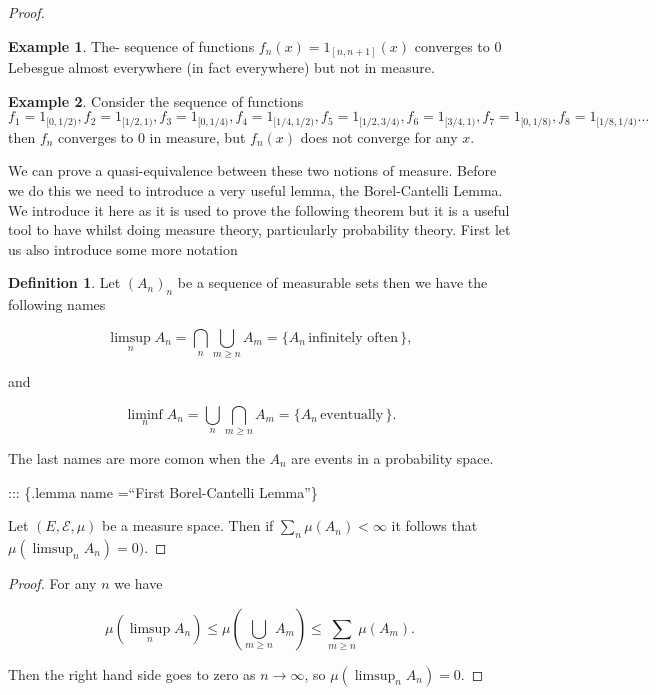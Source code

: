 \documentclass[
]{book}
\theoremstyle{definition}
\newtheorem{definition}{Definition}[chapter]
\theoremstyle{definition}
\newtheorem{example}{Example}[chapter]
\theoremstyle{definition}
\theoremstyle{definition}
\theoremstyle{remark}
\begin{document}
\begin{proof}
\begin{example}
The- sequence of functions \(f_n(x) = 1_{[n,n+1]}(x)\) converges to 0 Lebesgue almost everywhere (in fact everywhere) but not in measure.
\end{example}

\begin{example}
Consider the sequence of functions \(f_1 = 1_{[0,1/2)}, f_2 = 1_{[1/2, 1)}, f_3 = 1_{[0,1/4)}, f_4 = 1_{[1/4, 1/2)}, f_5= 1_{[1/2, 3/4)}, f_6 = 1_{[3/4,1)}, f_7 = 1_{[0,1/8)}, f_8 = 1_{[1/8, 1/4)} \dots\) then \(f_n\) converges to 0 in measure, but \(f_n(x)\) does not converge for any \(x\).
\end{example}

We can prove a quasi-equivalence between these two notions of measure. Before we do this we need to introduce a very useful lemma, the Borel-Cantelli Lemma. We introduce it here as it is used to prove the following theorem but it is a useful tool to have whilst doing measure theory, particularly probability theory. First let us also introduce some more notation

\begin{definition}
Let \((A_n)_n\) be a sequence of measurable sets then we have the following names

\[ \limsup_n A_n = \bigcap_n \bigcup_{m \geq n} A_m = \{ A_n \, \mbox{infinitely often}\,\}, \]

and

\[ \liminf_n A_n = \bigcup_n \bigcap_{m \geq n} A_m = \{ A_n \, \mbox{eventually}\,\}. \]

The last names are more comon when the \(A_n\) are events in a probability space.
\end{definition}

::: \{.lemma name =``First Borel-Cantelli Lemma''\}

Let \((E, \mathcal{E}, \mu)\) be a measure space. Then if \(\sum_n \mu(A_n) < \infty\) it follows that \(\mu(\limsup_n A_n) = 0)\).

\end{proof}

\begin{proof}
For any \(n\) we have

\[ \mu(\limsup_n A_n) \leq \mu \left( \bigcup_{m \geq n} A_m\right) \leq \sum_{m \geq n} \mu(A_m). \]

Then the right hand side goes to zero as \(n \rightarrow \infty\), so \(\mu(\limsup_n A_n) = 0\).
\end{proof}
\end{document}
